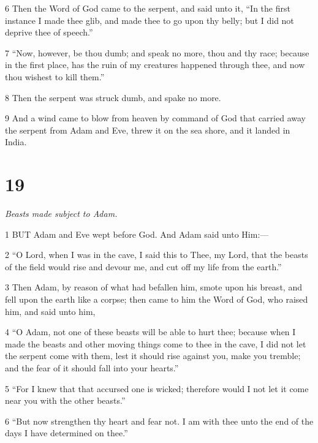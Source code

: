 \par 6 Then the Word of God came to the serpent, and said unto it, “In the first instance I made thee glib, and made thee to go upon thy belly; but I did not deprive thee of speech.”

\par 7 “Now, however, be thou dumb; and speak no more, thou and thy race; because in the first place, has the ruin of my creatures happened through thee, and now thou wishest to kill them.”

\par 8 Then the serpent was struck dumb, and spake no more.

\par 9 And a wind came to blow from heaven by command of God that carried away the serpent from Adam and Eve, threw it on the sea shore, and it landed in India.

\chapter{19}

\par \textit{Beasts made subject to Adam.}

\par 1 BUT Adam and Eve wept before God. And Adam said unto Him:—

\par 2 “O Lord, when I was in the cave, I said this to Thee, my Lord, that the beasts of the field would rise and devour me, and cut off my life from the earth.”

\par 3 Then Adam, by reason of what had befallen him, smote upon his breast, and fell upon the earth like a corpse; then came to him the Word of God, who raised him, and said unto him,

\par 4 “O Adam, not one of these beasts will be able to hurt thee; because when I made the beasts and other moving things come to thee in the cave, I did not let the serpent come with them, lest it should rise against you, make you tremble; and the fear of it should fall into your hearts.”

\par 5 “For I knew that that accursed one is wicked; therefore would I not let it come near you with the other beasts.”

\par 6 “But now strengthen thy heart and fear not. I am with thee unto the end of the days I have determined on thee.”

